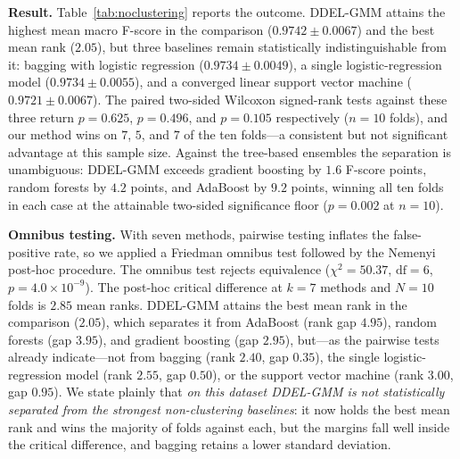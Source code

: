 \documentclass[lettersize,journal]{IEEEtran}
\newcommand{\tfourhighlight}[1]{{\color{tier4blue}#1}}
\begin{document}
		\tfourhighlight{\noindent \textbf{Result.} Table~\ref{tab:noclustering} reports the outcome. DDEL-GMM attains the highest mean macro F-score in the comparison ($0.9742 \pm 0.0067$) and the best mean rank ($2.05$), but three baselines remain statistically indistinguishable from it: bagging with logistic regression ($0.9734 \pm 0.0049$), a single logistic-regression model ($0.9734 \pm 0.0055$), and a converged linear support vector machine ($0.9721 \pm 0.0067$). The paired two-sided Wilcoxon signed-rank tests against these three return $p = 0.625$, $p = 0.496$, and $p = 0.105$ respectively ($n = 10$ folds), and our method wins on $7$, $5$, and $7$ of the ten folds---a consistent but not significant advantage at this sample size. Against the tree-based ensembles the separation is unambiguous: DDEL-GMM exceeds gradient boosting by $1.6$ F-score points, random forests by $4.2$ points, and AdaBoost by $9.2$ points, winning all ten folds in each case at the attainable two-sided significance floor ($p = 0.002$ at $n = 10$).}
		
		\tfourhighlight{\noindent \textbf{Omnibus testing.} With seven methods, pairwise testing inflates the false-positive rate, so we applied a Friedman omnibus test followed by the Nemenyi post-hoc procedure. The omnibus test rejects equivalence ($\chi^2 = 50.37$, $\mathrm{df} = 6$, $p = 4.0 \times 10^{-9}$). The post-hoc critical difference at $k = 7$ methods and $N = 10$ folds is $2.85$ mean ranks. DDEL-GMM attains the best mean rank in the comparison ($2.05$), which separates it from AdaBoost (rank gap $4.95$), random forests (gap $3.95$), and gradient boosting (gap $2.95$), but---as the pairwise tests already indicate---not from bagging (rank $2.40$, gap $0.35$), the single logistic-regression model (rank $2.55$, gap $0.50$), or the support vector machine (rank $3.00$, gap $0.95$). We state plainly that \emph{on this dataset DDEL-GMM is not statistically separated from the strongest non-clustering baselines}: it now holds the best mean rank and wins the majority of folds against each, but the margins fall well inside the critical difference, and bagging retains a lower standard deviation.}
		
\end{document}
